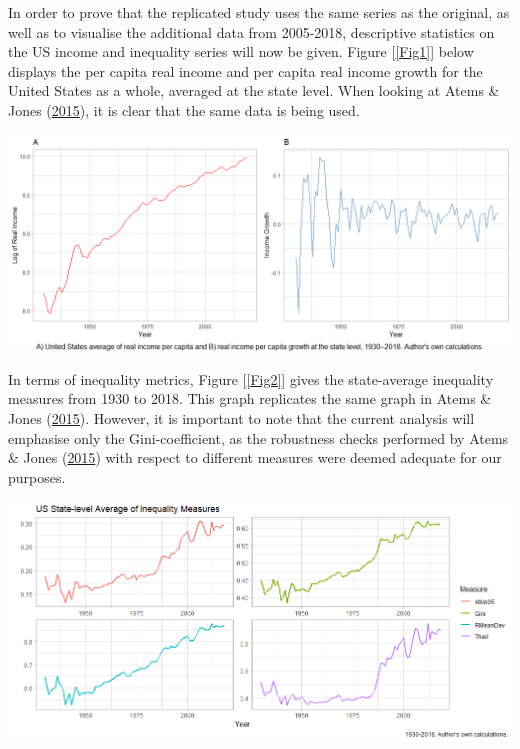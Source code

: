 \documentclass[11pt,preprint, authoryear]{elsarticle}
\let\origfigure\figure
\let\endorigfigure\endfigure
\renewenvironment{figure}[1][2] {
    \expandafter\origfigure\expandafter[H]
} {
    \endorigfigure
}
\numberwithin{equation}{section}
\numberwithin{figure}{section}
\numberwithin{table}{section}
\begin{document}
In order to prove that the replicated study uses the same series as the
original, as well as to visualise the additional data from 2005-2018,
descriptive statistics on the US income and inequality series will now
be given. Figure {[}\ref{Fig1}{]} below displays the per capita real
income and per capita real income growth for the United States as a
whole, averaged at the state level. When looking at Atems \& Jones
(\protect\hyperlink{ref-atems}{2015}), it is clear that the same data is
being used.

\begin{figure}[H]
\includegraphics[width=1\linewidth]{Fig1_US_Income_gridplot} \caption{\label{Fig1}}\label{fig:Fig1}
\end{figure}

In terms of inequality metrics, Figure {[}\ref{Fig2}{]} gives the
state-average inequality measures from 1930 to 2018. This graph
replicates the same graph in Atems \& Jones
(\protect\hyperlink{ref-atems}{2015}). However, it is important to note
that the current analysis will emphasise only the Gini-coefficient, as
the robustness checks performed by Atems \& Jones
(\protect\hyperlink{ref-atems}{2015}) with respect to different measures
were deemed adequate for our purposes.

\begin{figure}[H]
\includegraphics[width=1\linewidth]{Fig2_Inequality_Measures} \caption{\label{Fig2}}\label{fig:Fig2}
\end{figure}
\end{document}
